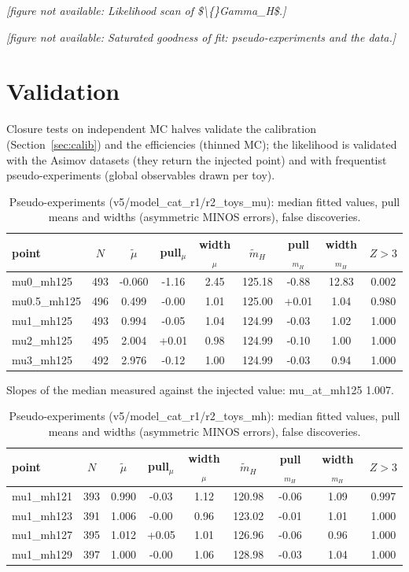 \documentclass[11pt,a4paper]{article}
\begin{document}
\noindent\textit{[figure not available: Likelihood scan of \$\textbackslash\{\}Gamma\_H\$.]}

\noindent\textit{[figure not available: Saturated goodness of fit: pseudo-experiments and the data.]}

\section{Validation}
Closure tests on independent MC halves validate the calibration (Section~\ref{sec:calib}) and the efficiencies (thinned MC); the likelihood is validated with the Asimov datasets (they return the injected point) and with frequentist pseudo-experiments (global observables drawn per toy).
\begin{table}[H]\centering\scriptsize\caption{Pseudo-experiments (v5/model\_cat\_r1/r2\_toys\_mu): median fitted values, pull means and widths (asymmetric MINOS errors), false discoveries.}\begin{tabular}{lcccccccc}\toprule point & $N$ & $\tilde\mu$ & pull$_\mu$ & width$_\mu$ & $\tilde m_H$ & pull$_{m_H}$ & width$_{m_H}$ & $Z>3$\\\midrule
mu0\_mh125 & 493 & -0.060 & -1.16 & 2.45 & 125.18 & -0.88 & 12.83 & 0.002\\
mu0.5\_mh125 & 496 & 0.499 & -0.00 & 1.01 & 125.00 & +0.01 & 1.04 & 0.980\\
mu1\_mh125 & 493 & 0.994 & -0.05 & 1.04 & 124.99 & -0.03 & 1.02 & 1.000\\
mu2\_mh125 & 495 & 2.004 & +0.01 & 0.98 & 124.99 & -0.10 & 1.00 & 1.000\\
mu3\_mh125 & 492 & 2.976 & -0.12 & 1.00 & 124.99 & -0.03 & 0.94 & 1.000\\
\bottomrule\end{tabular}\end{table}
Slopes of the median measured against the injected value: mu\_at\_mh125 1.007.
\begin{table}[H]\centering\scriptsize\caption{Pseudo-experiments (v5/model\_cat\_r1/r2\_toys\_mh): median fitted values, pull means and widths (asymmetric MINOS errors), false discoveries.}\begin{tabular}{lcccccccc}\toprule point & $N$ & $\tilde\mu$ & pull$_\mu$ & width$_\mu$ & $\tilde m_H$ & pull$_{m_H}$ & width$_{m_H}$ & $Z>3$\\\midrule
mu1\_mh121 & 393 & 0.990 & -0.03 & 1.12 & 120.98 & -0.06 & 1.09 & 0.997\\
mu1\_mh123 & 391 & 1.006 & -0.00 & 0.96 & 123.02 & -0.01 & 1.01 & 1.000\\
mu1\_mh127 & 395 & 1.012 & +0.05 & 1.01 & 126.96 & -0.06 & 0.96 & 1.000\\
mu1\_mh129 & 397 & 1.000 & -0.00 & 1.06 & 128.98 & -0.03 & 1.04 & 1.000\\
\bottomrule\end{tabular}\end{table}
\end{document}
